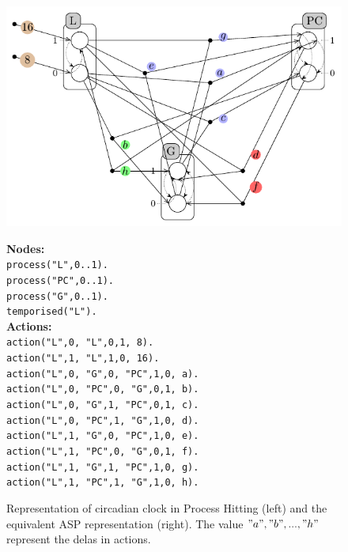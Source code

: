 \begin{figure}[htb!]
\vspace{1.5cm}
\includegraphics[width=0.63\linewidth]{images/circadianPH.pdf}
%
\hspace{0.1cm}
%
\begin{minipage}{0.32\linewidth}
\vspace{-5cm}
	\textbf{Nodes:} \\
\texttt{{\ssmall process("L",0..1).} }\\
\texttt{{\ssmall process("PC",0..1).}}\\
\texttt{{\ssmall process("G",0..1).} }\\
\texttt{{\ssmall temporised("L").} }\\

\textbf{Actions:} \\
\texttt{{\ssmall action("L",0, "L",0,1,  8).}} ~\\
\texttt{{\ssmall action("L",1, "L",1,0,  16).}} ~\\
\texttt{{\ssmall action("L",0, "G",0, "PC",1,0,  a).}} ~\\
\texttt{{\ssmall action("L",0, "PC",0, "G",0,1, b).}} ~\\
\texttt{{\ssmall action("L",0, "G",1, "PC",0,1, c).}} ~\\
\texttt{{\ssmall action("L",0, "PC",1, "G",1,0, d).}} \\
\texttt{{\ssmall action("L",1, "G",0, "PC",1,0,  e).}} ~\\
\texttt{{\ssmall action("L",1, "PC",0, "G",0,1, f).}} ~\\
\texttt{{\ssmall action("L",1, "G",1, "PC",1,0, g).}} ~\\
\texttt{{\ssmall action("L",1, "PC",1, "G",1,0, h).}} 

\end{minipage}
\label{fig:PH_circadian}
\caption{Representation of circadian clock in Process Hitting (left) and the equivalent ASP representation (right). The value $"a", "b", ..., "h"$ represent the delas in actions. }
\end{figure}
%

